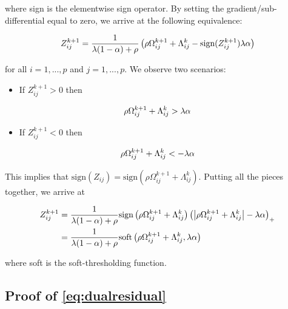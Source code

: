 \documentclass[11pt,]{report}
\providecommand{\tightlist}{%
  \setlength{\itemsep}{0pt}\setlength{\parskip}{0pt}}
\begin{document}
where sign is the elementwise sign operator. By setting the gradient/sub-differential equal to zero, we arrive at the following equivalence:

\begin{equation}
Z_{ij}^{k + 1} = \frac{1}{\lambda(1 - \alpha) + \rho}\left( \rho \Omega_{ij}^{k + 1} + \Lambda_{ij}^{k} - \mbox{sign}(Z_{ij}^{k + 1})\lambda\alpha \right)
\label{eq:ZZsoftproof}\notag
\end{equation}

for all \(i = 1,..., p\) and \(j = 1,..., p\). We observe two scenarios:

\begin{itemize}
\tightlist
\item
  If \(Z_{ij}^{k + 1} > 0\) then
\end{itemize}

\begin{equation}
\rho\Omega_{ij}^{k + 1} + \Lambda_{ij}^{k} > \lambda\alpha \notag
\end{equation}

\begin{itemize}
\tightlist
\item
  If \(Z_{ij}^{k + 1} < 0\) then
\end{itemize}

\begin{equation}
\rho\Omega_{ij}^{k + 1} + \Lambda_{ij}^{k} < -\lambda\alpha \notag
\end{equation}

This implies that \(\mbox{sign}(Z_{ij}) = \mbox{sign}(\rho\Omega_{ij}^{k + 1} + \Lambda_{ij}^{k})\). Putting all the pieces together, we arrive at

\begin{equation}
\begin{split}
Z_{ij}^{k + 1} &= \frac{1}{\lambda(1 - \alpha) + \rho}\mbox{sign}\left(\rho\Omega_{ij}^{k + 1} + \Lambda_{ij}^{k}\right)\left( \left| \rho\Omega_{ij}^{k + 1} + \Lambda_{ij}^{k} \right| - \lambda\alpha \right)_{+} \\
&= \frac{1}{\lambda(1 - \alpha) + \rho}\mbox{soft}\left(\rho\Omega_{ij}^{k + 1} + \Lambda_{ij}^{k}, \lambda\alpha\right)
\label{eq:appendixZZproof}\notag
\end{split}
\end{equation}

where soft is the soft-thresholding function.

\hypertarget{proofdualresidual}{%
\subsection{Proof of \eqref{eq:dualresidual}}\label{proofdualresidual}}
\end{document}
